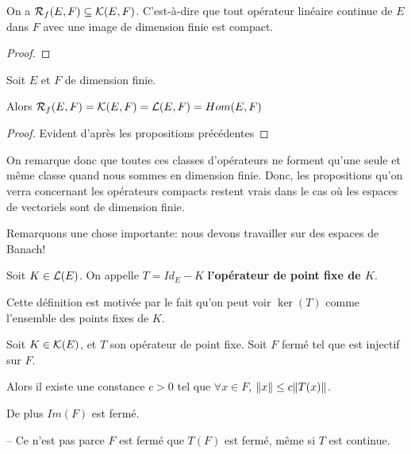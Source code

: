 \begin{proposition}
	On a $\mathcal{R}_{f}(E, F) \subseteq \mathcal{K}(E, F)$. C'est-à-dire
	que tout opérateur linéaire continue de $E$ dans $F$ avec une image de
	dimension finie est compact.
\end{proposition}

\begin{proof}
	
\end{proof}

\begin{proposition}
	Soit $E$ et $F$ de dimension finie.
	
	Alors $\mathcal{R}_{f}(E, F) = \mathcal{K}(E, F) =
	\mathcal{L}(E, F) = Hom(E, F)$
\end{proposition}

\begin{proof}
	Evident d'après les propositions précédentes
\end{proof}

On remarque donc que toutes ces classes d'opérateurs ne forment qu'une seule et
même classe quand nous sommes en dimension finie. Donc, les propositions qu'on
verra concernant les opérateurs compacts restent vrais dans le cas où les
espaces de vectoriels sont de dimension finie.

Remarquons une chose importante: nous devons travailler sur des espaces de
Banach!


\begin{definition} 
	Soit $K \in \mathcal{L}(E)$. On appelle $T = Id_{E} - K$
	\textbf{l'opérateur de point fixe de $K$}.
	
	Cette définition est motivée par le fait qu'on peut voir $\ker(T)$ comme
	l'ensemble des points fixes de $K$.
\end{definition}

\begin{proposition}
	\label{prop:fixe_point_closed_injective}
	Soit $K \in \mathcal{K}(E)$, et $T$ son opérateur de point fixe. Soit $F$
	fermé tel que  est injectif sur $F$.

	Alors il existe une constance $c > 0$ tel que $\forall x \in F$, $\norm{x}
	\leq c \norm{T(x)}$.

	De plus $Im(F)$ est fermé.
\end{proposition}

\begin{remarque}
	-- Ce n'est pas parce $F$ est fermé que $T(F)$ est fermé, même si $T$ est
	continue.
\end{remarque}

